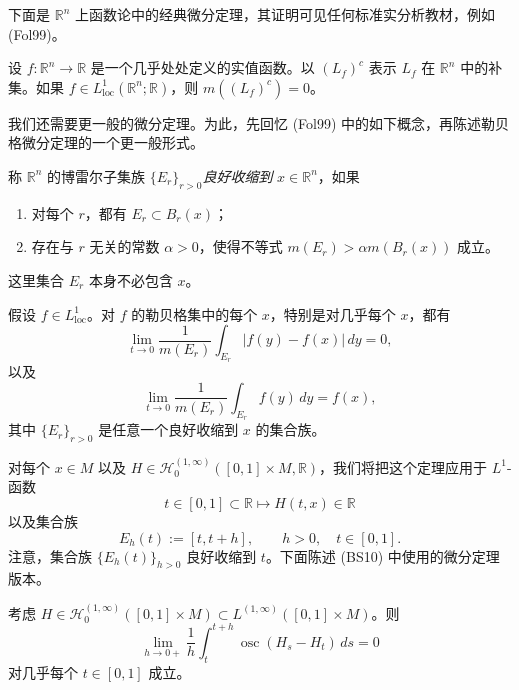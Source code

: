 下面是 $\mathbb R^n$ 上函数论中的经典微分定理，其证明可见任何标准实分析教材，例如 (Fol99)。

\begin{theorem}[勒贝格微分定理]\label{thm:lebesgue-differentiation}
设 $f:\mathbb R^n\to\mathbb R$ 是一个几乎处处定义的实值函数。以
$(L_f)^c$ 表示 $L_f$ 在 $\mathbb R^n$ 中的补集。如果
$f\in L^1_{\mathrm{loc}}(\mathbb R^n;\mathbb R)$，则
$m((L_f)^c)=0$。
\end{theorem}

我们还需要更一般的微分定理。为此，先回忆 (Fol99) 中的如下概念，再陈述勒贝格微分定理的一个更一般形式。

\begin{definition}\label{def:shrinks-nicely}
称 $\mathbb R^n$ 的博雷尔子集族 $\{E_r\}_{r>0}$\emph{良好收缩到} $x\in\mathbb R^n$，如果
\begin{enumerate}[label=(\arabic*)]
 \item 对每个 $r$，都有 $E_r\subset B_r(x)$；
 \item 存在与 $r$ 无关的常数 $\alpha>0$，使得不等式
 $m(E_r)>\alpha m(B_r(x))$ 成立。
\end{enumerate}
这里集合 $E_r$ 本身不必包含 $x$。
\end{definition}

\begin{theorem}\label{thm:lebesgue-differentiation-nice-shrinking}
假设 $f\in L^1_{\mathrm{loc}}$。对 $f$ 的勒贝格集中的每个
$x$，特别是对几乎每个 $x$，都有
\begin{equation}
 \lim_{t\to0}\frac1{m(E_r)}
 \int_{E_r}|f(y)-f(x)|\,dy=0,
 \label{eq:lebesgue-differentiation-absolute}
\end{equation}
以及
\begin{equation}
 \lim_{t\to0}\frac1{m(E_r)}
 \int_{E_r}f(y)\,dy=f(x),
 \label{eq:lebesgue-differentiation-average}
\end{equation}
其中 $\{E_r\}_{r>0}$ 是任意一个良好收缩到 $x$ 的集合族。
\end{theorem}

对每个 $x\in M$ 以及
$H\in\mathcal H_0^{(1,\infty)}([0,1]\times M,\mathbb R)$，我们将把这个定理应用于
$L^1$-函数
\[
 t\in[0,1]\subset\mathbb R\longmapsto H(t,x)\in\mathbb R
\]
以及集合族
\[
 E_h(t):=[t,t+h],\qquad h>0,\quad t\in[0,1].
\]
注意，集合族 $\{E_h(t)\}_{h>0}$ 良好收缩到 $t$。下面陈述 (BS10) 中使用的微分定理版本。

\begin{proposition}
\label{prop:topological-hamiltonian-lebesgue-differentiation}
考虑
$H\in\mathcal H_0^{(1,\infty)}([0,1]\times M)
\subset L^{(1,\infty)}([0,1]\times M)$。则
\[
 \lim_{h\to0+}\frac1h\int_t^{t+h}
 \operatorname{osc}(H_s-H_t)\,ds=0
\]
对几乎每个 $t\in[0,1]$ 成立。
\end{proposition}

